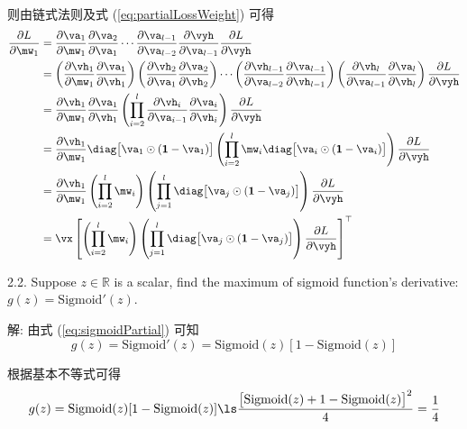 \documentclass[openany]{ctexbook}
\theoremstyle{kaiti}
\theoremstyle{normal}
\begin{document}
则由链式法则及式 (\ref{eq:partialLossWeight}) 可得
\begin{equation}
  \begin{aligned}
    \frac{\partial L}{\partial\mw_1}
    &=\frac{\partial\va_1}{\partial\mw_1}\frac{\partial\va_{2}}{\partial\va_{1}}\cdots\frac{\partial\va_{l-1}}{\partial\va_{l-2}}\frac{\partial\vyh}{\partial\va_{l-1}}\frac{\partial L}{\partial\vyh}\\
    &=\left(\frac{\partial\vh_1}{\partial\mw_1}
    \frac{\partial\va_{1}}{\partial\vh_{1}}\right)
    \left(\frac{\partial\vh_2}{\partial\va_1}
    \frac{\partial\va_{2}}{\partial\vh_{2}}\right)
    \cdots
    \left(\frac{\partial\vh_{l-1}}{\partial\va_{l-2}}
    \frac{\partial\va_{l-1}}{\partial\vh_{l-1}}\right)
    \left(\frac{\partial\vh_{l}}{\partial\va_{l-1}}
    \frac{\partial\va_l}{\partial\vh_{l}}\right)
    \frac{\partial L}{\partial\vyh}\\
    &=\frac{\partial\vh_1}{\partial\mw_1}
    \frac{\partial\va_{1}}{\partial\vh_{1}}
    \left(\prod_{i=2}^l\frac{\partial\vh_i}{\partial\va_{i-1}}
    \frac{\partial\va_{i}}{\partial\vh_{i}}\right)
    \frac{\partial L}{\partial\vyh}\\
    &=\frac{\partial\vh_1}{\partial\mw_1}
    \diag\big[\va_1\odot(\bm{1}-\va_1)\big]
    \left(\prod_{i=2}^l\mw_i\diag\big[\va_i\odot(\bm{1}-\va_i)\big]\right)
    \frac{\partial L}{\partial\vyh}\\
    &=\frac{\partial\vh_1}{\partial\mw_1}
    \left(\prod_{i=2}^l\mw_i\right)\left(\prod_{j=1}^l\diag\big[\va_j\odot(\bm{1}-\va_j)\big]\right)
    \frac{\partial L}{\partial\vyh}\\
    &=\vx\left[\left(\prod_{i=2}^l\mw_i\right)\left(\prod_{j=1}^l\diag\big[\va_j\odot(\bm{1}-\va_j)\big]\right)
    \frac{\partial L}{\partial\vyh}\right]^\top\\
  \end{aligned}
\end{equation}

2.2. Suppose $z\in\mathbb R$ is a scalar, find the maximum of sigmoid function's derivative: $g(z)=\mathrm{Sigmoid}'(z)$.

解: 由式 (\ref{eq:sigmoidPartial}) 可知
\begin{equation}
  g(z)=\mathrm{Sigmoid}'(z)=\mathrm{Sigmoid}(z)[1-\mathrm{Sigmoid}(z)]
\end{equation}

根据基本不等式可得
\begin{equation}
  g(z)=\mathrm{Sigmoid}(z)[1-\mathrm{Sigmoid}(z)]\ls\frac{\big[\mathrm{Sigmoid}(z)+1-\mathrm{Sigmoid}(z)\big]^2}{4}=\frac{1}{4}
\end{equation}
\end{document}
